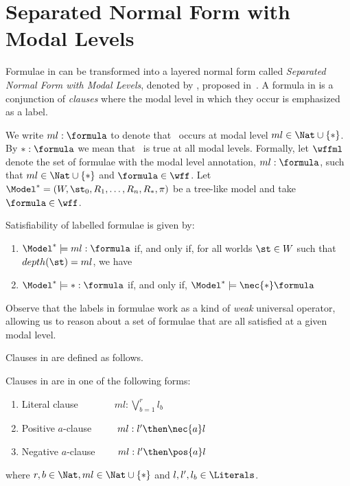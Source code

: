 
\section{Separated Normal Form with Modal Levels}

Formulae in  can be transformed into a layered normal form called
\emph{Separated Normal Form with Modal Levels}, denoted by
, proposed in~\cite{journals/jal/NalonD07}. A formula in  is a
conjunction of \emph{clauses} where the modal level in which they occur is
emphasized as a label.

We write $ml: \formula$ to denote that \formula~occurs at modal level $ml\in
\Nat \cup \{*\}$. By $*: \formula$ we mean that \formula~is true at
all modal levels. Formally, let $\wffml$ denote the set of formulae with
the modal level annotation, $ml : \formula$, such that $ml \in \Nat \cup \{*\}$
and $\formula \in \wff$. Let $\Model^* = (W, \st_0, R_1, \ldots, R_n, R_*, \pi)$
be a tree-like model and take $\formula \in \wff$. 

\begin{definition}
Satisfiability of labelled formulae is given by:

\begin{enumerate}
    \item $\Model^* \models ml : \formula$ if, and only if, for all worlds
        $\st \in W$ such that $depth(\st) = ml$, we have
        \sat{\Model^*}{\st}{\formula} 
    \item $\Model^* \models * : \formula$ if, and only if, $\Model^* \models
        \nec{*} \formula$
\end{enumerate}
    
\end{definition}

Observe that the labels in formulae work as a kind of \textit{weak} universal
operator, allowing us to reason about a set of formulae that are all satisfied
at a given modal level.

Clauses in  are defined as follows.

\begin{definition}
    Clauses in  are in one of the following forms:
    \begin{enumerate}
        \item Literal clause $\ \ \quad \qquad ml : \bigvee^r_{b=1} l_b$
        \item Positive $a$-clause $\ \qquad ml : l' \then \nec{a} l$
        \item Negative $a$-clause $\qquad ml : l' \then \pos{a} l$
    \end{enumerate}
    where $r, b \in \Nat, ml \in \Nat \cup \{*\}$ and $l, l', l_b \in
    \Literals$.
\end{definition}

